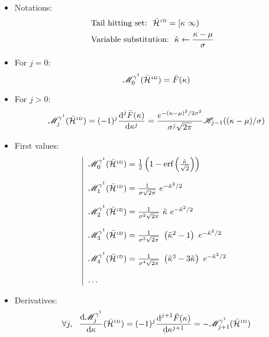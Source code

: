\documentclass[12pt]{article}
\begin{document}
\begin{itemize}
\item Notations:
  \begin{subequations}
    \begin{flalign}
      & \text{Tail hitting set:} \ \ \bar{\mathcal{H}}^{\text{\tiny1D}}=[\kappa\ \infty) & \\
      & \text{Variable substitution:} \ \ \tilde{\kappa} \leftarrow \frac{\kappa-\mu}{\sigma} &
    \end{flalign}
  \end{subequations}
\item For $j=0$:
\begin{equation}
  \mathscr{M}^{\gamma^1}_0(\bar{\mathcal{H}}^{\text{\tiny1D}})=\bar{F}(\kappa)
\end{equation}
\item For $j>0$:
\begin{equation}
  \mathscr{M}^{\gamma^1}_j(\bar{\mathcal{H}}^{\text{\tiny1D}})=(-1)^j\frac{\text{d}^j\bar{F}(\kappa)}{\text{d}\kappa^j}=\frac{e^{-(\kappa-\mu)^2/2\sigma^2}}{\sigma^j\sqrt{2\pi}}\mathscr{H}_{j-1}((\kappa-\mu)/\sigma)
\end{equation}
\item First values:
\begin{equation}
  \left|
  \begin{array}{l}
    \GMFa_0(\HST) = \frac{1}{2}\left(1-\erf\left(\frac{\clset}{\sqrt{2}}\right)\right) \\ \\
    \GMFa_1(\HST) = \frac{1}{\std  \sqrt{2\pi}}\ e^{-\clset^2/2} \\ \\
    \GMFa_2(\HST) = \frac{1}{\std^2\sqrt{2\pi}}\ \clset \ e^{-\clset^2/2} \\ \\
    \GMFa_3(\HST) = \frac{1}{\std^3\sqrt{2\pi}}\ \left(\clset^2-1\right) \ e^{-\clset^2/2} \\ \\
    \GMFa_4(\HST) = \frac{1}{\std^4\sqrt{2\pi}}\ \left(\clset^3-3\clset\right) \ e^{-\clset^2/2} \\ \\
    \dots
  \end{array}
  \right.
\end{equation}
\item Derivatives:
\begin{equation}
  \forall j, \ \ \frac{\text{d}\GMFa_j}{\text{d}\lset}(\HST)=(-1)^j\frac{\text{d}^{j+1}\TP(\lset)}{\text{d}\lset^{j+1}}=-\GMFa_{j+1}(\HST)
\end{equation}
\end{itemize}
\end{document}
